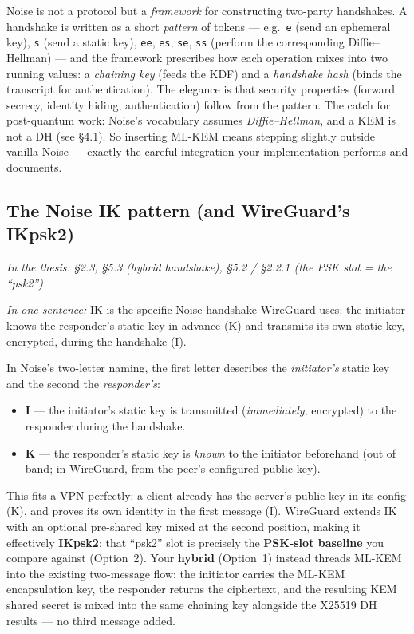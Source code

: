 \documentclass[11pt]{article}
\newcommand{\seethesis}[1]{%
  {\small\color{softgray}\textit{In the thesis: #1}}\par\vspace{3pt}}
\newcommand{\nutshell}[1]{\noindent\textit{In one sentence:} #1\par\vspace{4pt}}
\begin{document}
Noise is not a protocol but a \emph{framework} for constructing two-party
handshakes. A handshake is written as a short \emph{pattern} of tokens --- e.g.\
\texttt{e} (send an ephemeral key), \texttt{s} (send a static key), \texttt{ee},
\texttt{es}, \texttt{se}, \texttt{ss} (perform the corresponding
Diffie--Hellman) --- and the framework prescribes how each operation mixes into
two running values: a \emph{chaining key} (feeds the KDF) and a \emph{handshake
hash} (binds the transcript for authentication). The elegance is that security
properties (forward secrecy, identity hiding, authentication) follow from the
pattern. The catch for post-quantum work: Noise's vocabulary assumes
\emph{Diffie--Hellman}, and a KEM is not a DH (see \S4.1). So inserting ML-KEM
means stepping slightly outside vanilla Noise --- exactly the careful integration
your implementation performs and documents.

\subsection{The Noise IK pattern (and WireGuard's IKpsk2)}
\seethesis{\S2.3, \S5.3 (hybrid handshake), \S5.2 / \S2.2.1 (the PSK slot = the ``psk2'').}
\nutshell{IK is the specific Noise handshake WireGuard uses: the initiator knows
the responder's static key in advance (K) and transmits its own static key,
encrypted, during the handshake (I).}

In Noise's two-letter naming, the first letter describes the \emph{initiator's}
static key and the second the \emph{responder's}:
\begin{itemize}
  \item \textbf{I} --- the initiator's static key is transmitted (\emph{immediately},
  encrypted) to the responder during the handshake.
  \item \textbf{K} --- the responder's static key is \emph{known} to the
  initiator beforehand (out of band; in WireGuard, from the peer's configured
  public key).
\end{itemize}
This fits a VPN perfectly: a client already has the server's public key in its
config (K), and proves its own identity in the first message (I). WireGuard
extends IK with an optional pre-shared key mixed at the second position, making it
effectively \textbf{IKpsk2}; that ``psk2'' slot is precisely the \textbf{PSK-slot
baseline} you compare against (Option~2). Your \textbf{hybrid} (Option~1) instead
threads ML-KEM into the existing two-message flow: the initiator carries the
ML-KEM encapsulation key, the responder returns the ciphertext, and the resulting
KEM shared secret is mixed into the same chaining key alongside the X25519 DH
results --- no third message added.
\end{document}
